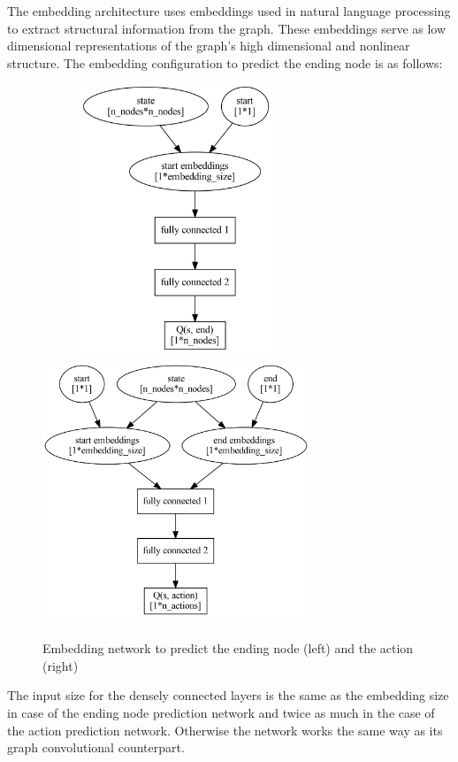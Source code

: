 \documentclass[
]{elteikthesis}[2023/04/10]
\begin{document}
The embedding architecture uses embeddings used in natural language
processing to extract structural information from the graph. These
embeddings serve as low dimensional representations of the graph's
high dimensional and nonlinear structure. The embedding configuration
to predict the ending node is as follows:

\begin{figure}[H]
\begin{centering}
\includegraphics[width=8cm,height=8cm,keepaspectratio]{images/enn_end}
\includegraphics[width=8cm,height=8cm,keepaspectratio]{images/enn_action}
\par\end{centering}
\caption{Embedding network to predict the ending node (left) and the action
(right)}

\end{figure}

The input size for the densely connected layers is the same as the
embedding size in case of the ending node prediction network and twice
as much in the case of the action prediction network. Otherwise the
network works the same way as its graph convolutional counterpart.
\end{document}
